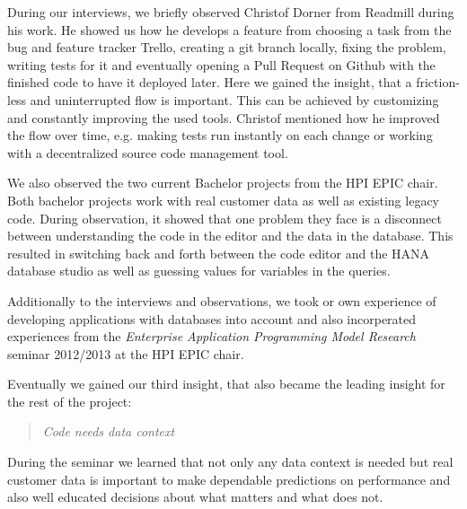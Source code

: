 
During our interviews, we briefly observed Christof Dorner from Readmill during his work. He showed us how he develops a feature from choosing a task from the bug and feature tracker Trello, creating a git branch locally, fixing the problem, writing tests for it and eventually opening a Pull Request on Github with the finished code to have it deployed later. Here we gained the insight, that a friction-less and uninterrupted flow is important. This can be achieved by customizing and constantly improving the used tools. Christof mentioned how he improved the flow over time, e.g. making tests run instantly on each change or working with a decentralized source code management tool.

We also observed the two current Bachelor projects from the HPI EPIC chair. Both bachelor projects work with real customer data as well as existing legacy code. During observation, it showed that one problem they face is a disconnect between understanding the code in the editor and the data in the database. This resulted in switching back and forth between the code editor and the HANA database studio as well as guessing values for variables in the queries.

Additionally to the interviews and observations, we took or own experience of developing applications with databases into account and also incorperated experiences from the \emph{Enterprise Application Programming Model Research} seminar 2012/2013 at the HPI EPIC chair.

Eventually we gained our third insight, that also became the leading insight for the rest of the project: 

\begin{quote}
\emph{Code needs data context}
\end{quote}

During the seminar we learned that not only any data context is needed but real customer data is important to make dependable predictions on performance and also well educated decisions about what matters and what does not.